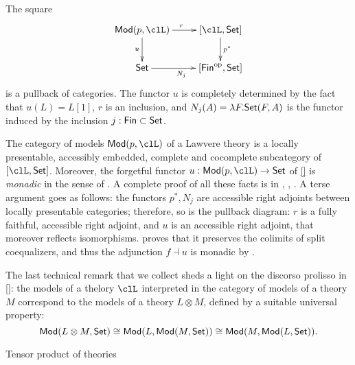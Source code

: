 \documentclass{amsart}
\begin{document}
\begin{corollary}
  The square 
  \[
  \xymatrix{
    \cate{Mod}(p,\clL) \ar[d]_u \ar[r]^r & [\clL,\Set]\ar[d]^{p^*} \\ 
    \Set \ar[r]_{N_j} & [\cate{Fin}^\op,\Set]
  }  
  \]
  is a pullback of categories. The functor $u$ is completely determined by the fact that $u(L) = L[1]$, $r$ is an inclusion, and $N_j(A) = \lambda F.\mathsf{Set}(F,A)$ is the functor induced by the inclusion $j : \mathsf{Fin} \subset \mathsf{Set}$.
\end{corollary}
\begin{corollary}
  The category of models $\cate{Mod}(p,\clL)$ of a Lawvere theory is a locally presentable, accessibly embedded, complete and cocomplete subcategory of $[\clL,\Set]$. Moreover, the forgetful functor $u : \cate{Mod}(p,\clL) \to \Set$ of \ref{} is \emph{monadic} in the sense of \cite[]{}. A complete proof of all these facts is in \cite[]{}, \cite[]{}, \cite[]{}. A terse argument goes as follows: the functors $p^*, N_j$ are accessible right adjoints between locally presentable categories; therefore, so is the pullback diagram: $r$ is a fully faithful, accessible right adjoint, and $u$ is an accessible right adjoint, that moreover reflects isomorphisms. \cite[]{} proves that it preserves the colimits of split coequalizers, and thus the adjunction $f \dashv u$ is monadic by \cite[]{}.
\end{corollary}
The last technical remark that we collect sheds a light on the discorso prolisso in \ref{}: the models of a thelory $\clL$ interpreted in the category of models of a theory $M$ correspond to the models of a theory $L \otimes M$, defined by a suitable universal property: 
\[
\mathsf{Mod}(L\otimes M,\mathsf{Set})  \cong
\mathsf{Mod}(L, \mathsf{Mod}(M,\mathsf{Set}))  \cong
\mathsf{Mod}(M, \mathsf{Mod}(L,\mathsf{Set})).
\]
\begin{definition}
  Tensor product of theories
\end{definition}
\end{document}

